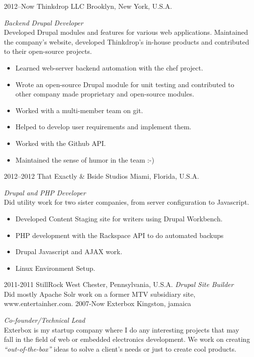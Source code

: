\documentclass[]{friggeri-cv} %
\begin{document}
\begin{entrylist}
\entry
{2012--Now}
{Thinkdrop LLC}
{Brooklyn, New York, U.S.A.}
{\emph{Backend Drupal Developer} \\
Developed Drupal modules and features for various web applications. Maintained the company's website, developed Thinkdrop's in-house products and contributed to their open-source projects.
\begin{itemize}
\item Learned web-server backend automation with the chef project.
\item Wrote an open-source Drupal module for unit testing and contributed to other company made proprietary and open-source modules.
\item Worked with a multi-member team on git.
\item Helped to develop user requirements and implement them.
\item Worked with the Github API.
\item Maintained the sense of humor in the team :-)
\end{itemize}}
\entry
{2012--2012}
{That Exactly \& Bside Studios}
{Miami, Florida, U.S.A.}
{\emph{Drupal and PHP Developer} \\
Did utility work for two sister companies, from server configuration to Javascript.
\begin{itemize}
\item Developed Content Staging site for writers using Drupal Workbench.
\item PHP development with the Rackspace API to do automated backups
\item Drupal Javascript and AJAX work.
\item Linux Environment Setup.
\end{itemize}}
\entry
{2011-2011}
{StillRock}
{West Chester, Pennsylvania, U.S.A.}
{\emph{Drupal Site Builder} \\
Did mostly Apache Solr work on a former MTV subsidiary site, www.entertainher.com.}
\entry
{2007-Now}
{Exterbox}
{Kingston, jamaica}
{\emph{Co-founder/Technical Lead} \\
Exterbox is my startup company where I do any interesting projects that may fall in the field of web or embedded electronics development. We work on creating \emph{``out-of-the-box''} ideas to solve a client's needs or just to create cool products.
}
\end{entrylist}
\end{document}
